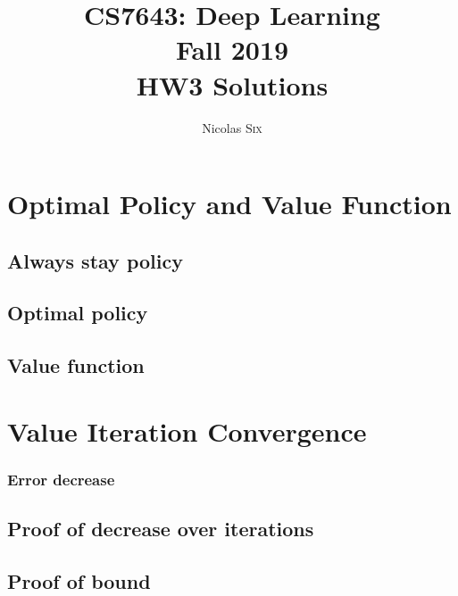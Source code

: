 \documentclass[11pt,english]{article}
\begin{document}
    \title{CS7643: Deep Learning \\
    Fall 2019\\ HW3 Solutions}
    \author{Nicolas \textsc{Six}}
    \maketitle



    \section{Optimal Policy and Value Function}
    \subsection{Always stay policy}
    

    \pagebreak
    \subsection{Optimal policy}
    

    \pagebreak
    \subsection{Value function}
    

    \pagebreak
    \section{Value Iteration Convergence}
    \subsubsection{Error decrease}
    

    \pagebreak
    \subsection{Proof of decrease over iterations}
    

    \pagebreak
    \subsection{Proof of bound}
    
\end{document}
